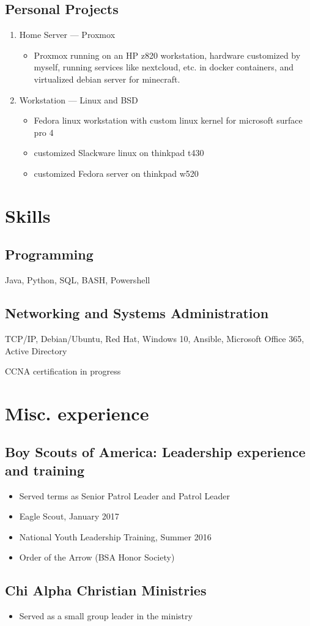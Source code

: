 \documentclass{article}
\begin{document}
\subsection{Personal Projects}
\begin{enumerate}
    \item Home Server --- Proxmox
        \begin{itemize}
            \item Proxmox running on an HP z820 workstation, hardware customized by myself,
                running services like nextcloud, etc. in docker containers, and virtualized debian
                server for minecraft.
        \end{itemize}
    \item Workstation --- Linux and BSD
        \begin{itemize}
            \item Fedora linux workstation with custom linux kernel for microsoft surface pro 4
            \item customized Slackware linux on thinkpad t430
            \item customized Fedora server on thinkpad w520
        \end{itemize}
\end{enumerate}

\section{Skills}

\subsection{Programming}

Java, Python, SQL, BASH, Powershell
\subsection{Networking and Systems Administration}

TCP/IP, Debian/Ubuntu, Red Hat, Windows 10, Ansible, Microsoft Office 365, Active Directory


CCNA certification in progress


\section{Misc. experience}
  \subsection{Boy Scouts of America: Leadership experience and training}
    \begin{itemize}
      \item Served terms as Senior Patrol Leader and Patrol Leader
      \item Eagle Scout, January 2017
      \item National Youth Leadership Training, Summer 2016
      \item Order of the Arrow (BSA Honor Society)
    \end{itemize}
  \subsection{Chi Alpha Christian Ministries}
    \begin{itemize}
      \item Served as a small group leader in the ministry
    \end{itemize}
\end{document}
